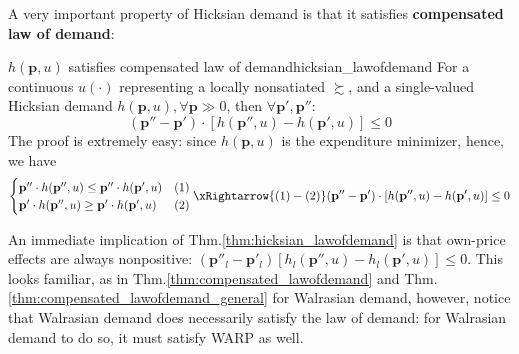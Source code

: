 A very important property of Hicksian demand is that it satisfies \textbf{compensated law of demand}:
\begin{theorem}{$h(\mathbf{p},u)$ satisfies compensated law of demand}{hicksian_lawofdemand}
    For a continuous $u(\cdot)$ representing a locally nonsatiated $\succsim$, and a single-valued Hicksian demand $h(\mathbf{p},u),\forall \mathbf{p}\gg 0$, then $\forall \mathbf{p}',\mathbf{p}''$:
    $$(\mathbf{p}''-\mathbf{p}')\cdot [h(\mathbf{p}'',u)-h(\mathbf{p}',u)]\leq 0$$
    The proof is extremely easy: since $h(\mathbf{p},u)$ is the expenditure minimizer, hence, we have
    $$
    \begin{cases}
        \mathbf{p}''\cdot h(\mathbf{p}'',u) \leq \mathbf{p}''\cdot h(\mathbf{p}',u) &(1)\\
        \mathbf{p}'\cdot h(\mathbf{p}'',u) \geq \mathbf{p}'\cdot h(\mathbf{p}',u)&(2)
    \end{cases}\xRightarrow{(1)-(2)}(\mathbf{p}''-\mathbf{p}')\cdot [h(\mathbf{p}'',u)-h(\mathbf{p}',u)]\leq 0
    $$
\end{theorem}
An immediate implication of Thm.\ref{thm:hicksian_lawofdemand} is that own-price effects are always nonpositive: $(\mathbf{p}''_l-\mathbf{p}'_l)[h_l(\mathbf{p}'',u)-h_l(\mathbf{p}',u)]\leq 0$.
This looks familiar, as in Thm.\ref{thm:compensated_lawofdemand} and Thm.\ref{thm:compensated_lawofdemand_general} for Walrasian demand, however, notice that Walrasian demand does  necessarily satisfy the law of demand: for Walrasian demand to do so, it must satisfy WARP as well.

